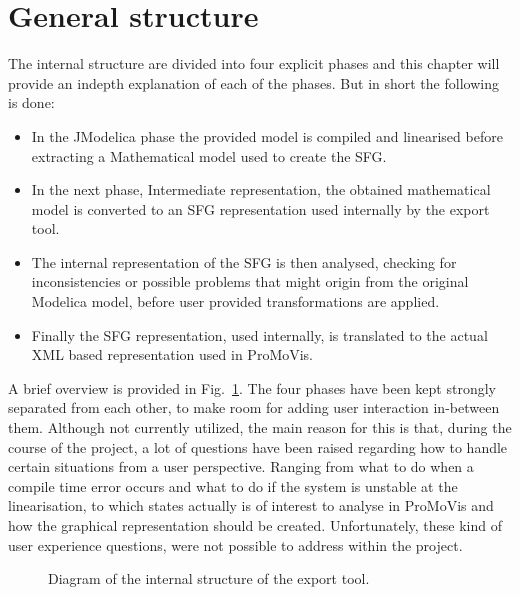 \section{General structure}
The internal structure are divided into four explicit phases and this chapter will provide an indepth explanation of each of the phases. But in short the following is done:
\begin{itemize}
\item In the JModelica phase the provided model is compiled and linearised before extracting a Mathematical model used to create the SFG.
\item In the next phase, Intermediate representation, the obtained mathematical model is converted to an SFG representation used internally by the export tool. 
\item The internal representation of the SFG is then analysed, checking for inconsistencies or possible problems that might origin from the original Modelica model, before user provided transformations are applied. 
\item Finally  the  SFG representation, used internally, is translated to the actual XML based representation used in ProMoVis.
\end{itemize}
A brief overview is provided in Fig.~\ref{fig:phase}. The four phases have been kept strongly separated  from each other, to make room for adding user interaction in-between them. Although not currently utilized, the main reason for this is that, during the course of the project, a lot of questions have been raised regarding how to handle certain situations from a user perspective. Ranging from what to do when a compile time error occurs and what to do if the system is unstable at the linearisation, to  which states actually is of interest to analyse in ProMoVis and how the graphical representation should be created. Unfortunately, these kind of user experience questions, were not possible to address within the project. 
\begin{figure}[h]
\caption{Diagram of the internal structure of the export tool.}
\label{fig:phase}
\end{figure}

